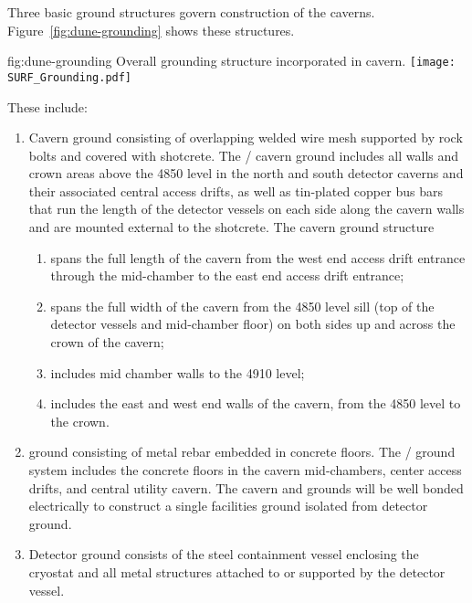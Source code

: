 Three basic ground structures govern
construction of the caverns. Figure~\ref{fig:dune-grounding} shows these structures.
\begin{dunefigure}{fig:dune-grounding}
  {Overall  grounding structure incorporated in cavern.}
  \texttt{[image: SURF\_Grounding.pdf]}
\end{dunefigure}
These include:
\begin{enumerate}
 \item Cavern ground consisting of overlapping welded wire mesh
   supported by rock bolts and covered with shotcrete. The
   / cavern ground includes all walls and
   crown areas above the 4850 level in the north and south detector
   caverns and their associated central access drifts, as well as tin-plated
   copper bus bars that run the length of the detector vessels
   on each side along the cavern walls and are mounted external to the
   shotcrete.  The cavern ground structure
\begin{enumerate}
 \item spans the full length of the cavern from the west end access
   drift entrance through the mid-chamber to the east end access drift
   entrance;
 \item spans the full width of the cavern from the 4850 level sill
   (top of the detector vessels and mid-chamber floor) on both sides
   up and across the crown of the cavern;
 \item includes mid chamber walls to the 4910 level;
 \item includes the east and west end walls of the cavern, from the
   4850 level to the crown.
\end{enumerate}
 \item {} ground consisting of metal rebar embedded in
   concrete floors. The /  ground
   system includes the concrete floors in the cavern mid-chambers,
   center access drifts, and central utility cavern. The cavern and
    grounds will be well bonded electrically to construct
   a single facilities ground isolated from detector ground.
 \item Detector ground consists of the steel containment vessel
   enclosing the cryostat and all metal structures attached to or
   supported by the detector vessel.
\end{enumerate}



